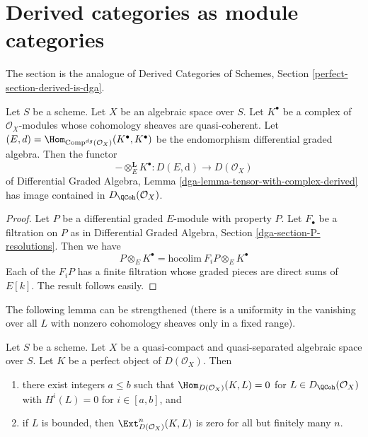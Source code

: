 \section{Derived categories as module categories}
\label{section-derived-is-dga}

\noindent
The section is the analogue of
Derived Categories of Schemes, Section \ref{perfect-section-derived-is-dga}.

\begin{lemma}
\label{lemma-tensor-with-QCoh-complex}
Let $S$ be a scheme. Let $X$ be an algebraic space over $S$. Let $K^\bullet$
be a complex of $\mathcal{O}_X$-modules whose cohomology sheaves are
quasi-coherent. Let
$(E, d) = \Hom_{\text{Comp}^{dg}(\mathcal{O}_X)}(K^\bullet, K^\bullet)$
be the endomorphism differential graded algebra. Then the functor
$$
- \otimes_E^\mathbf{L} K^\bullet :
D(E, \text{d}) \longrightarrow D(\mathcal{O}_X)
$$
of
Differential Graded Algebra, Lemma
\ref{dga-lemma-tensor-with-complex-derived}
has image contained in $D_\QCoh(\mathcal{O}_X)$.
\end{lemma}

\begin{proof}
Let $P$ be a differential graded $E$-module with property $P$.
Let $F_\bullet$ be a filtration on $P$ as in
Differential Graded Algebra, Section \ref{dga-section-P-resolutions}.
Then we have
$$
P \otimes_E K^\bullet = \text{hocolim}\ F_iP \otimes_E K^\bullet
$$
Each of the $F_iP$ has a finite filtration whose graded pieces
are direct sums of $E[k]$. The result follows easily.
\end{proof}

\noindent
The following lemma can be strengthened (there is a uniformity
in the vanishing over all $L$ with nonzero cohomology sheaves
only in a fixed range).

\begin{lemma}
\label{lemma-ext-from-perfect-into-bounded-QCoh}
Let $S$ be a scheme.
Let $X$ be a quasi-compact and quasi-separated algebraic space over $S$.
Let $K$ be a perfect object of $D(\mathcal{O}_X)$. Then
\begin{enumerate}
\item there exist integers $a \leq b$ such that
$\Hom_{D(\mathcal{O}_X)}(K, L) = 0$ for $L \in D_\QCoh(\mathcal{O}_X)$
with $H^i(L) = 0$ for $i \in [a, b]$, and
\item if $L$ is bounded, then $\Ext^n_{D(\mathcal{O}_X)}(K, L)$
is zero for all but finitely many $n$.
\end{enumerate}
\end{lemma}

